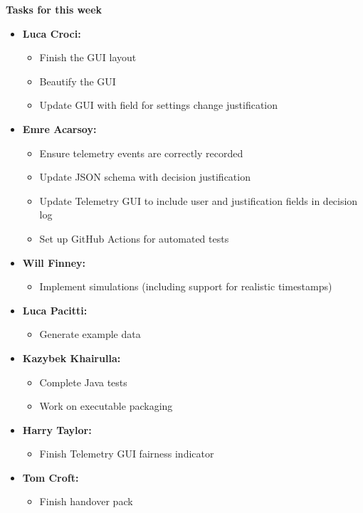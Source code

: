 \documentclass[11pt]{article}
\begin{document}
    \textbf{Tasks for this week}
    \begin{itemize}
        \item \textbf{Luca Croci:}
        \begin{itemize}
            \item Finish the GUI layout
            \item Beautify the GUI
            \item Update GUI with field for settings change justification
        \end{itemize}

        \item \textbf{Emre Acarsoy:}
        \begin{itemize}
            \item Ensure telemetry events are correctly recorded
            \item Update JSON schema with decision justification
            \item Update Telemetry GUI to include user and justification fields in decision log
            \item Set up GitHub Actions for automated tests
        \end{itemize}

        \item \textbf{Will Finney:}
        \begin{itemize}
            \item Implement simulations (including support for realistic timestamps)
        \end{itemize}

        \item \textbf{Luca Pacitti:}
        \begin{itemize}
            \item Generate example data
        \end{itemize}

        \item \textbf{Kazybek Khairulla:}
        \begin{itemize}
            \item Complete Java tests
            \item Work on executable packaging
        \end{itemize}

        \item \textbf{Harry Taylor:}
        \begin{itemize}
            \item Finish Telemetry GUI fairness indicator
        \end{itemize}

        \item \textbf{Tom Croft:}
        \begin{itemize}
            \item Finish handover pack
        \end{itemize}
    \end{itemize}
\end{document}
